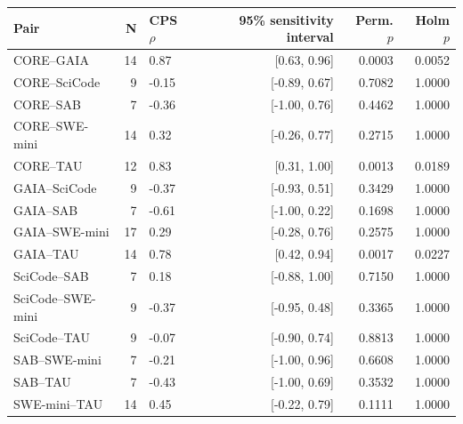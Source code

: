 \begin{tabular}{lrlrrr}
\toprule
Pair & N & CPS $\rho$ & 95\% sensitivity interval & Perm. $p$ & Holm $p$ \\
\midrule
CORE--GAIA & 14 & 0.87 & [0.63, 0.96] & 0.0003 & 0.0052 \\
CORE--SciCode & 9 & -0.15 & [-0.89, 0.67] & 0.7082 & 1.0000 \\
CORE--SAB & 7 & -0.36 & [-1.00, 0.76] & 0.4462 & 1.0000 \\
CORE--SWE-mini & 14 & 0.32 & [-0.26, 0.77] & 0.2715 & 1.0000 \\
CORE--TAU & 12 & 0.83 & [0.31, 1.00] & 0.0013 & 0.0189 \\
GAIA--SciCode & 9 & -0.37 & [-0.93, 0.51] & 0.3429 & 1.0000 \\
GAIA--SAB & 7 & -0.61 & [-1.00, 0.22] & 0.1698 & 1.0000 \\
GAIA--SWE-mini & 17 & 0.29 & [-0.28, 0.76] & 0.2575 & 1.0000 \\
GAIA--TAU & 14 & 0.78 & [0.42, 0.94] & 0.0017 & 0.0227 \\
SciCode--SAB & 7 & 0.18 & [-0.88, 1.00] & 0.7150 & 1.0000 \\
SciCode--SWE-mini & 9 & -0.37 & [-0.95, 0.48] & 0.3365 & 1.0000 \\
SciCode--TAU & 9 & -0.07 & [-0.90, 0.74] & 0.8813 & 1.0000 \\
SAB--SWE-mini & 7 & -0.21 & [-1.00, 0.96] & 0.6608 & 1.0000 \\
SAB--TAU & 7 & -0.43 & [-1.00, 0.69] & 0.3532 & 1.0000 \\
SWE-mini--TAU & 14 & 0.45 & [-0.22, 0.79] & 0.1111 & 1.0000 \\
\bottomrule
\end{tabular}
